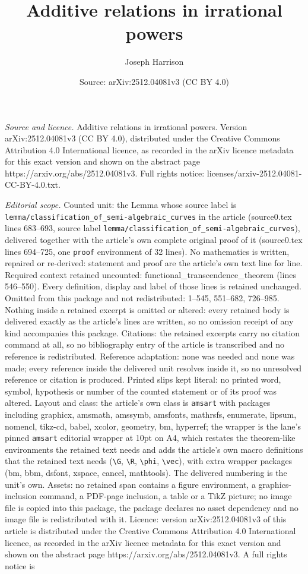 \documentclass[10pt,a4paper]{amsart}
\title[Additive relations in irrational powers]{Additive relations in irrational powers}
\author{Joseph Harrison}
\date{Source: arXiv:2512.04081v3 (CC BY 4.0)}
\begin{document}
\maketitle

\noindent\emph{Source and licence.} Additive relations in irrational powers. Version arXiv:2512.04081v3 (CC BY 4.0), distributed under the Creative Commons Attribution 4.0 International licence, as recorded in the arXiv licence metadata for this exact version and shown on the abstract page https://arxiv.org/abs/2512.04081v3. Full rights notice: licenses/arxiv-2512.04081-CC-BY-4.0.txt.\par\smallskip

\noindent\textit{Editorial scope.} Counted unit: the Lemma whose source label is \texttt{lemma/classification\_of\_semi-algebraic\_curves} in the article (source0.tex lines 683--693, source label \texttt{lemma/classification\_of\_semi-algebraic\_curves}), delivered together with the article's own complete original proof of it (source0.tex lines 694--725, one \texttt{proof} environment of 32 lines). No mathematics is written, repaired or re-derived: statement and proof are the article's own text line for line. Required context retained uncounted: functional\_transcendence\_theorem (lines 546--550). Every definition, display and label of those lines is retained unchanged. Omitted from this package and not redistributed: 1--545, 551--682, 726--985. Nothing inside a retained excerpt is omitted or altered: every retained body is delivered exactly as the article's lines are written, so no omission receipt of any kind accompanies this package. Citations: the retained excerpts carry no citation command at all, so no bibliography entry of the article is transcribed and no reference is redistributed. Reference adaptation: none was needed and none was made; every reference inside the delivered unit resolves inside it, so no unresolved reference or citation is produced. Printed slips kept literal: no printed word, symbol, hypothesis or number of the counted statement or of its proof was altered. Layout and class: the article's own class is \texttt{amsart} with packages including graphicx, amsmath, amssymb, amsfonts, mathrsfs, enumerate, lipsum, nomencl, tikz-cd, babel, xcolor, geometry, bm, hyperref; the wrapper is the lane's pinned \texttt{amsart} editorial wrapper at 10pt on A4, which restates the theorem-like environments the retained text needs and adds the article's own macro definitions that the retained text needs (\texttt{\textbackslash G}, \texttt{\textbackslash R}, \texttt{\textbackslash phi}, \texttt{\textbackslash vec}), with extra wrapper packages (bm, bbm, dsfont, xspace, cancel, mathtools). The delivered numbering is the unit's own. Assets: no retained span contains a figure environment, a graphics-inclusion command, a PDF-page inclusion, a table or a TikZ picture; no image file is copied into this package, the package declares no asset dependency and no image file is redistributed with it. Licence: version arXiv:2512.04081v3 of this article is distributed under the Creative Commons Attribution 4.0 International licence, as recorded in the arXiv licence metadata for this exact version and shown on the abstract page https://arxiv.org/abs/2512.04081v3. A full rights notice is 
\end{document}
